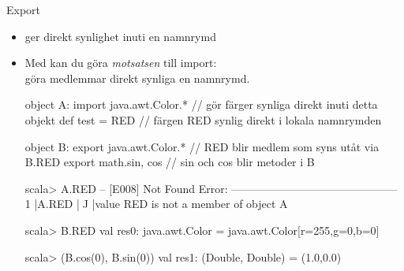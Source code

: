 \begin{Slide}{Export}
\begin{itemize}\SlideFontSmall
  \item {} ger direkt synlighet  inuti en namnrymd
  \item Med  kan du göra \emph{motsatsen} till import: \\
göra medlemmar direkt synliga  en namnrymd.
\begin{CodeSmall}
object A:
  import java.awt.Color.* // gör färger synliga direkt inuti detta objekt
  def test = RED          // färgen RED synlig direkt i lokala namnrymden

object B:
  export java.awt.Color.* // RED blir medlem som syns utåt via B.RED
  export math.{sin, cos}  // sin och cos blir metoder i B
\end{CodeSmall}

\begin{REPLsmall}
scala> A.RED
-- [E008] Not Found Error: ---------------------------------------------
1 |A.RED
  |^^^^^
  |value RED is not a member of object A

scala> B.RED
val res0: java.awt.Color = java.awt.Color[r=255,g=0,b=0]

scala> (B.cos(0), B.sin(0))
val res1: (Double, Double) = (1.0,0.0)
\end{REPLsmall}
\end{itemize}

\end{Slide}

\ifswedish




